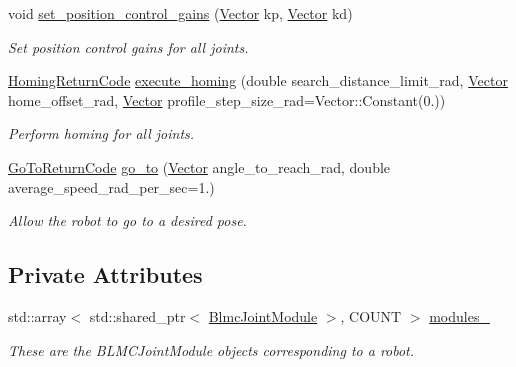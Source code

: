 \begin{DoxyCompactItemize}
void \hyperlink{classblmc__robots_1_1BlmcJointModules_a524fd41f808027190d59460a4787aea6}{set\+\_\+position\+\_\+control\+\_\+gains} (\hyperlink{classblmc__robots_1_1BlmcJointModules_abaff382c6fd4b494ec0c17498d94919e}{Vector} kp, \hyperlink{classblmc__robots_1_1BlmcJointModules_abaff382c6fd4b494ec0c17498d94919e}{Vector} kd)
\begin{DoxyCompactList}\small\item\em Set position control gains for all joints. \end{DoxyCompactList}\item 
\hyperlink{blmc__joint__module_8hpp_aa1075809042ff261e4b0a20d161448b6}{Homing\+Return\+Code} \hyperlink{classblmc__robots_1_1BlmcJointModules_a4b3dfee12a87fddf81961fab48e3dae4}{execute\+\_\+homing} (double search\+\_\+distance\+\_\+limit\+\_\+rad, \hyperlink{classblmc__robots_1_1BlmcJointModules_abaff382c6fd4b494ec0c17498d94919e}{Vector} home\+\_\+offset\+\_\+rad, \hyperlink{classblmc__robots_1_1BlmcJointModules_abaff382c6fd4b494ec0c17498d94919e}{Vector} profile\+\_\+step\+\_\+size\+\_\+rad=Vector\+::\+Constant(0.))
\begin{DoxyCompactList}\small\item\em Perform homing for all joints. \end{DoxyCompactList}\item 
\hyperlink{blmc__joint__module_8hpp_ae2dd8b0230887c948d2583feb6beb051}{Go\+To\+Return\+Code} \hyperlink{classblmc__robots_1_1BlmcJointModules_afc82da986738d3a2265e5cf6337d3251}{go\+\_\+to} (\hyperlink{classblmc__robots_1_1BlmcJointModules_abaff382c6fd4b494ec0c17498d94919e}{Vector} angle\+\_\+to\+\_\+reach\+\_\+rad, double average\+\_\+speed\+\_\+rad\+\_\+per\+\_\+sec=1.)
\begin{DoxyCompactList}\small\item\em Allow the robot to go to a desired pose. \end{DoxyCompactList}\end{DoxyCompactItemize}
\subsection*{Private Attributes}
\begin{DoxyCompactItemize}
\item 
std\+::array$<$ std\+::shared\+\_\+ptr$<$ \hyperlink{classblmc__robots_1_1BlmcJointModule}{Blmc\+Joint\+Module} $>$, C\+O\+U\+NT $>$ \hyperlink{classblmc__robots_1_1BlmcJointModules_a40ab7b84d3b54d298209098cdf81a14d}{modules\+\_\+}\hypertarget{classblmc__robots_1_1BlmcJointModules_a40ab7b84d3b54d298209098cdf81a14d}{}\label{classblmc__robots_1_1BlmcJointModules_a40ab7b84d3b54d298209098cdf81a14d}

\begin{DoxyCompactList}\small\item\em These are the B\+L\+M\+C\+Joint\+Module objects corresponding to a robot. \end{DoxyCompactList}\end{DoxyCompactItemize}


